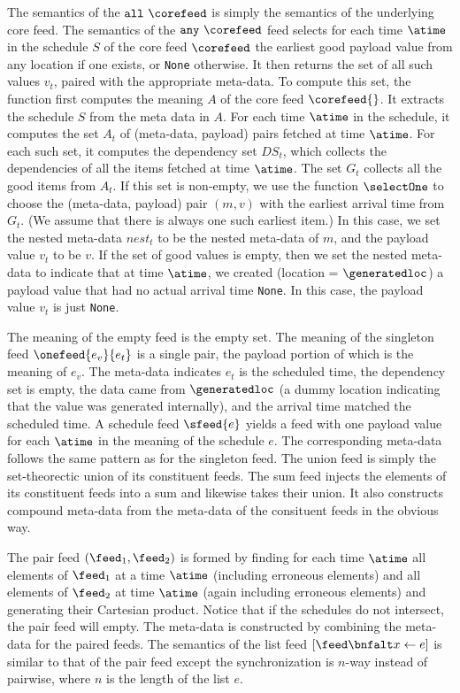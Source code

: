 The semantics of the $\mathtt{all}\ \corefeed$ is simply the semantics
of the underlying core feed.
The semantics of the $\mathtt{any}\ \corefeed$ feed selects for each
time $\atime$ in the schedule $S$ of the core feed $\corefeed$ the
earliest good payload value from any location if one exists, or
\texttt{None} otherwise.  It then returns the set of all such values
$v_t$, paired with the appropriate meta-data.  
To compute this set, the function first computes
the meaning $A$ of the core feed $\corefeed{}$.  It extracts the
schedule $S$ from the meta data in $A$.  For each time $\atime$ in the
schedule, it computes the set $A_t$ of (meta-data, payload) pairs
fetched at time $\atime$.  For each such set, it computes the
dependency set $DS_t$, which collects the dependencies of all the
items fetched at time $\atime$.  The set $G_t$ collects all the good
items from $A_t$. If this set is non-empty, we use the function 
$\selectOne$ to choose the (meta-data, payload) pair $(m,v)$ with the
earliest arrival time from $G_t$.  (We assume that there is always one
such earliest item.)  In this case, we set the nested
meta-data $nest_t$ to be the nested meta-data of $m$, and the payload
value $v_t$ to be $v$.  If the set of good values is empty, then we set the nested
meta-data to indicate that at time $\atime$, we created (location =
$\generatedloc$) a payload value that had no actual
arrival time \texttt{None}.  In this case, the payload value $v_t$ is
just \texttt{None}. 

The meaning of the empty feed is the empty set.  
The meaning of the singleton feed $\onefeed{e_v}{e_t}$ is a single
pair, the payload portion of which is the meaning of $e_v$.  The
meta-data indicates $e_t$ is the scheduled time, the dependency
set is empty, the data came from $\generatedloc$ (a dummy location
indicating that the value was generated internally), and the arrival time
matched the scheduled time. 
A schedule feed $\sfeed{e}$ yields a feed with one payload value for
each $\atime$ in the meaning of the schedule $e$.  The corresponding
meta-data follows the same pattern as for the singleton feed.  
The union feed is simply the set-theorectic union of its constituent
feeds. The sum feed injects the elements of its constituent
feeds into a sum and likewise takes their union.  It also constructs
compound meta-data from the meta-data of the consituent feeds in the
obvious way.

The pair feed $(\feed_1,\feed_2)$ is formed by finding for each time
$\atime$ all elements
of $\feed_1$ at a time $\atime$ (including erroneous elements) and all
elements of $\feed_2$ at time $\atime$ (again including erroneous
elements) and generating their Cartesian product.  Notice that 
if the schedules do not intersect, the pair feed will empty.  The
meta-data is constructed by combining the meta-data for the paired
feeds.
The semantics of the list feed $[\feed \bnfalt x \leftarrow e ]$ is
similar to that of the pair feed except the synchronization is $n$-way
instead of pairwise, where $n$ is the length of the list $e$. 

